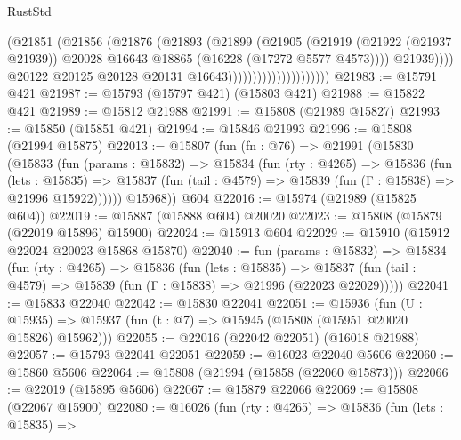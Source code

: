 \begin{lexlean}{RustStd}
\begin{coremodule}
                                            (@21851
                                              (@21856
                                                (@21876
                                                  (@21893
                                                    (@21899
                                                      (@21905
                                                        (@21919
                                                          (@21922 (@21937 @21939))
                                                          @20028
                                                          @16643
                                                          @18865
                                                          (@16228 (@17272 @5577 @4573))))
                                                      @21939))))
                                              @20122
                                              @20125
                                              @20128
                                              @20131
                                              @16643)))))))))))))))))))))
@21983 := @15791 @421
@21987 := @15793 (@15797 @421) (@15803 @421)
@21988 := @15822 @421
@21989 := @15812 @21988
@21991 := @15808 (@21989 @15827)
@21993 := @15850 (@15851 @421)
@21994 := @15846 @21993
@21996 := @15808 (@21994 @15875)
@22013 := @15807
    (fun (fn : @76) =>
    @21991
      (@15830
        (@15833
          (fun (params : @15832) =>
          @15834
            (fun (rty : @4265) =>
            @15836
              (fun (lets : @15835) =>
              @15837 (fun (tail : @4579) => @15839 (fun (Γ : @15838) => @21996 @15922))))))
        @15968))
    @604
@22016 := @15974 (@21989 (@15825 @604))
@22019 := @15887 (@15888 @604) @20020
@22023 := @15808 (@15879 (@22019 @15896) @15900)
@22024 := @15913 @604
@22029 := @15910 (@15912 @22024 @20023 @15868 @15870)
@22040 := fun (params : @15832) =>
  @15834
    (fun (rty : @4265) =>
    @15836
      (fun (lets : @15835) =>
      @15837 (fun (tail : @4579) => @15839 (fun (Γ : @15838) => @21996 (@22023 @22029)))))
@22041 := @15833 @22040
@22042 := @15830 @22041
@22051 := @15936
    (fun (U : @15935) => @15937 (fun (t : @7) => @15945 (@15808 (@15951 @20020 @15826) @15962)))
@22055 := @22016 (@22042 @22051) (@16018 @21988)
@22057 := @15793 @22041 @22051
@22059 := @16023 @22040 @5606
@22060 := @15860 @5606
@22064 := @15808 (@21994 (@15858 (@22060 @15873)))
@22066 := @22019 (@15895 @5606)
@22067 := @15879 @22066
@22069 := @15808 (@22067 @15900)
@22080 := @16026
    (fun (rty : @4265) =>
    @15836
      (fun (lets : @15835) =>

\end{coremodule}
\end{lexlean}
